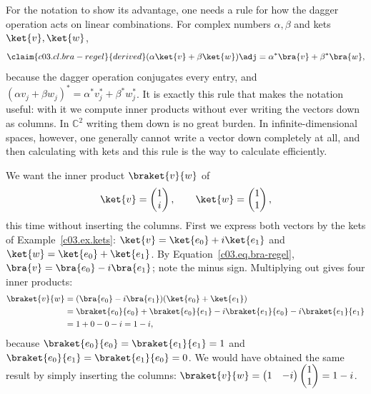 For the notation to show its advantage, one needs a rule for how the dagger operation acts on
linear combinations. For complex numbers $\alpha, \beta$ and kets $\ket{v}, \ket{w}$,
\begin{equation}\label{c03.eq.bra-regel}\claim{c03.cl.bra-regel}{derived}
  (\alpha \ket{v} + \beta \ket{w})\adj = \alpha^* \bra{v} + \beta^* \bra{w} ,
\end{equation}
because the dagger operation conjugates every entry, and
$(\alpha v_j + \beta w_j)^* = \alpha^* v_j^* + \beta^* w_j^*$. It is exactly this rule that
makes the notation useful: with it we compute inner products without ever writing the vectors
down as columns. In $\mathbb{C}^2$ writing them down is no great burden. In
infinite-dimensional spaces, however, one generally cannot write a vector down completely at
all, and then calculating with kets and this rule is the way to calculate efficiently.

\begin{example}\label{c03.ex.dirac}
  We want the inner product $\braket{v}{w}$ of
  \begin{equation}\label{c03.eq.dirac-vw}
    \ket{v} = \begin{pmatrix} 1 \\ i \end{pmatrix},
    \qquad
    \ket{w} = \begin{pmatrix} 1 \\ 1 \end{pmatrix},
  \end{equation}
  this time without inserting the columns. First we express both vectors by the kets of
  Example~\ref{c03.ex.kets}: $\ket{v} = \ket{e_0} + i \ket{e_1}$ and
  $\ket{w} = \ket{e_0} + \ket{e_1}$. By Equation~\eqref{c03.eq.bra-regel},
  $\bra{v} = \bra{e_0} - i \bra{e_1}$; note the minus sign. Multiplying out gives four inner
  products:
  \begin{equation}\label{c03.eq.dirac}
    \begin{aligned}
      \braket{v}{w} &= (\bra{e_0} - i \bra{e_1}) (\ket{e_0} + \ket{e_1}) \\
      &= \braket{e_0}{e_0} + \braket{e_0}{e_1} - i \braket{e_1}{e_0} - i \braket{e_1}{e_1} \\
      &= 1 + 0 - 0 - i = 1 - i ,
    \end{aligned}
  \end{equation}
  because $\braket{e_0}{e_0} = \braket{e_1}{e_1} = 1$ and $\braket{e_0}{e_1} = \braket{e_1}{e_0} = 0$.
  We would have obtained the same result by simply inserting the columns:
  $\braket{v}{w} = \begin{pmatrix} 1 & -i \end{pmatrix} \begin{pmatrix} 1 \\ 1 \end{pmatrix} = 1 - i$.
\end{example}

